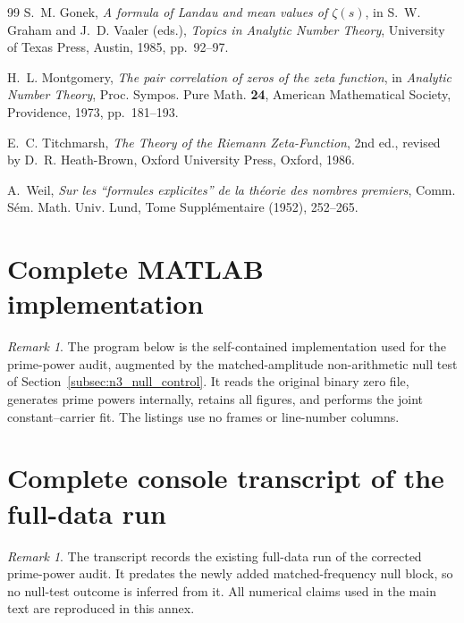 \documentclass[11pt]{amsart}
\numberwithin{equation}{section}
\theoremstyle{plain}
\theoremstyle{definition}
\theoremstyle{remark}
\newtheorem{remark}[theorem]{Remark}
\newcommand{\1}{\mathbf{1}}
\begin{document}
\begin{thebibliography}{99}
S.~M. Gonek,
\emph{A formula of Landau and mean values of \(\zeta(s)\)},
in S.~W. Graham and J.~D. Vaaler (eds.),
\emph{Topics in Analytic Number Theory},
University of Texas Press, Austin, 1985, pp.~92--97.


H.~L. Montgomery,
\emph{The pair correlation of zeros of the zeta function},
in \emph{Analytic Number Theory},
Proc. Sympos. Pure Math. \textbf{24},
American Mathematical Society, Providence, 1973, pp.~181--193.

E.~C. Titchmarsh,
\emph{The Theory of the Riemann Zeta-Function},
2nd ed., revised by D.~R. Heath-Brown,
Oxford University Press, Oxford, 1986.

A.~Weil,
\emph{Sur les ``formules explicites'' de la théorie des nombres premiers},
Comm. Sém. Math. Univ. Lund, Tome Supplémentaire (1952), 252--265.

\end{thebibliography}

\appendix

\section{Complete MATLAB implementation}
\label{app:matlab}

\begin{remark}
The program below is the self-contained implementation used for the
prime-power audit, augmented by the matched-amplitude non-arithmetic null test
of Section~\ref{subsec:n3_null_control}.  It reads the original binary zero
file, generates prime powers internally, retains all figures, and performs the
joint constant--carrier fit.  The listings use no frames or line-number
columns.
\end{remark}



\section{Complete console transcript of the full-data run}
\label{app:console_output}

\begin{remark}
The transcript records the existing full-data run of the corrected
prime-power audit.  It predates the newly added matched-frequency null block,
so no null-test outcome is inferred from it.  All numerical claims used in the
main text are reproduced in this annex.
\end{remark}
\end{document}
